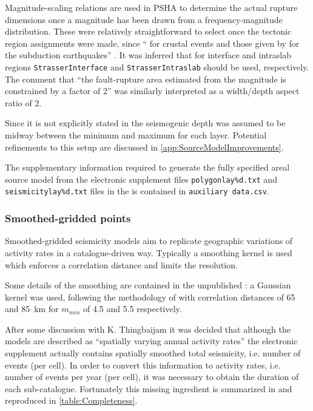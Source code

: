 \documentclass{article}
\begin{document}
Magnitude-scaling relations are used in PSHA to determine the actual rupture dimensions once a magnitude has been drawn from a frequency-magnitude distribution.
These were relatively straightforward to select once the tectonic region assignments were made, since ``\cite{wells1994new} for crustal events and those given by \cite{strasser2010scaling} for the subduction earthquakes'' \citep[p.~140]{nath2012probabilistic}.
It was inferred that for interface and intraslab regions \texttt{StrasserInterface} and \texttt{StrasserIntraslab} should be used, respectively.
The comment that ``the fault-rupture area estimated from the magnitude is constrained by a factor of 2'' \citep[p.~140]{nath2012probabilistic} was similarly interpreted as a width/depth aspect ratio of 2.

Since it is not explicitly stated in \cite{nath2012probabilistic} the seismogenic depth was assumed to be midway between the minimum and maximum for each layer.
Potential refinements to this setup are discussed in \autoref{app:SourceModelImprovements}.

The supplementary information required to generate the fully specified areal source model from the electronic supplement files \texttt{polygonlay\%d.txt} and \texttt{seismicitylay\%d.txt} files in the is contained in \texttt{auxiliary data.csv}.

\subsubsection{Smoothed-gridded points}
\label{subsubsec:Smoothed}

Smoothed-gridded seismicity models aim to replicate geographic variations of activity rates in a catalogue-driven way.
Typically a smoothing kernel is used which enforces a correlation distance and limits the resolution.

Some details of the smoothing are contained in the unpublished \cite{thingbaijam2011seismogenic}: a Gaussian kernel was used, following the methodology of \cite{frankel1995mapping} with correlation distances of 65 and 85~km for $m_{min}$ of 4.5 and 5.5 respectively.

After some discussion with K.
Thingbaijam it was decided that although the models are described as ``spatially varying annual activity rates'' \cite[p.~140]{nath2012probabilistic} the electronic supplement actually contains spatially smoothed total seismicity, i.e. number of events (per cell).
In order to convert this information to activity rates, i.e. number of events per year (per cell), it was necessary to obtain the duration of each sub-catalogue.
Fortunately this missing ingredient is summarized in \cite[Table 1]{thingbaijam2011seismogenic} and reproduced in \autoref{table:Completeness}.
\end{document}
